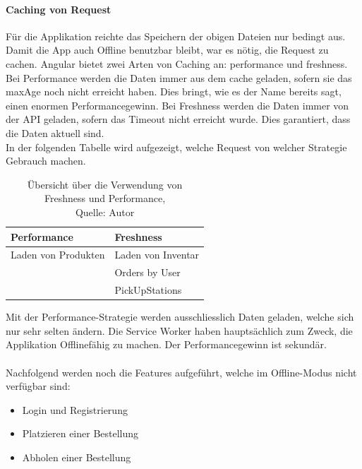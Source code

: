 \paragraph{Caching von Request}
Für die Applikation reichte das Speichern der obigen Dateien nur bedingt aus. Damit die App auch Offline benutzbar bleibt, war es nötig, die Request zu cachen. Angular bietet zwei Arten von Caching an: performance und freshness. Bei Performance werden die Daten immer aus dem cache geladen, sofern sie das maxAge noch nicht erreicht haben. Dies bringt, wie es der Name bereits sagt, einen enormen Performancegewinn. Bei Freshness werden die Daten immer von der API geladen, sofern das Timeout nicht erreicht wurde. Dies garantiert, dass die Daten aktuell sind. \\
In der folgenden Tabelle wird aufgezeigt, welche Request von welcher Strategie Gebrauch machen. 

\begin{table}[H]
	\setlength\extrarowheight{2pt} %
	\begin{tabularx}{\textwidth}{|X|l|}
		\hline
		\textbf{Performance} & \textbf{Freshness} \\
		\hline
		Laden von Produkten& Laden von Inventar\\
		\hline
		& Orders by User\\
		\hline
		& PickUpStations\\
		\hline
	\end{tabularx} 
	\caption[Übersicht über die Verwendung von Freshness und Performance]{Übersicht über die Verwendung von Freshness und Performance,\\ Quelle: Autor}
\end{table}\label{performanceFreshness}
Mit der Performance-Strategie werden ausschliesslich Daten geladen, welche sich nur sehr selten ändern. Die Service Worker haben hauptsächlich zum Zweck, die Applikation Offlinefähig zu machen. Der Performancegewinn ist sekundär. \\\\
Nachfolgend werden noch die Features aufgeführt, welche im Offline-Modus nicht verfügbar sind: 
\begin{itemize}
	\item Login und Registrierung
	\item Platzieren einer Bestellung
	\item Abholen einer Bestellung
\end{itemize}


